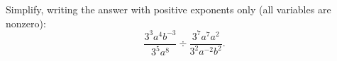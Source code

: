 Simplify, writing the answer with positive exponents only (all variables are nonzero):
\[
\dfrac{3^3a^4b^{-3}}{3^5a^8}\div\dfrac{3^7a^7a^2}{3^2a^{-2}b^2}.
\]
